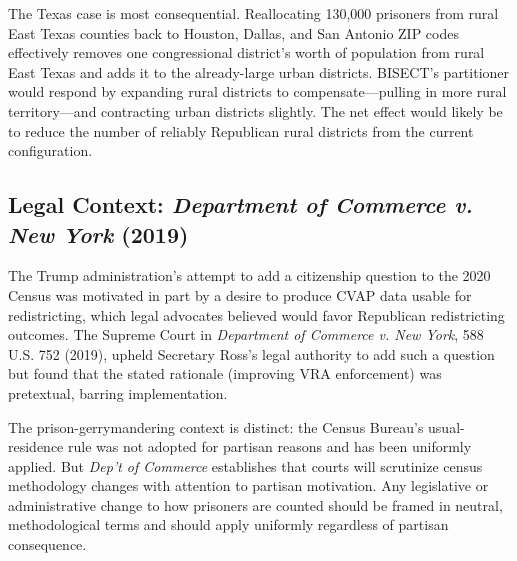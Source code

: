 The Texas case is most consequential. Reallocating 130,000 prisoners from rural East Texas counties back to Houston, Dallas, and San Antonio ZIP codes effectively removes one congressional district's worth of population from rural East Texas and adds it to the already-large urban districts. BISECT's partitioner would respond by expanding rural districts to compensate---pulling in more rural territory---and contracting urban districts slightly. The net effect would likely be to reduce the number of reliably Republican rural districts from the current configuration.

\subsection{Legal Context: \emph{Department of Commerce v. New York} (2019)}

The Trump administration's attempt to add a citizenship question to the 2020 Census was motivated in part by a desire to produce CVAP data usable for redistricting, which legal advocates believed would favor Republican redistricting outcomes. The Supreme Court in \emph{Department of Commerce v. New York}, 588 U.S. 752 (2019), upheld Secretary Ross's legal authority to add such a question but found that the stated rationale (improving VRA enforcement) was pretextual, barring implementation.

The prison-gerrymandering context is distinct: the Census Bureau's usual-residence rule was not adopted for partisan reasons and has been uniformly applied. But \emph{Dep't of Commerce} establishes that courts will scrutinize census methodology changes with attention to partisan motivation. Any legislative or administrative change to how prisoners are counted should be framed in neutral, methodological terms and should apply uniformly regardless of partisan consequence.
